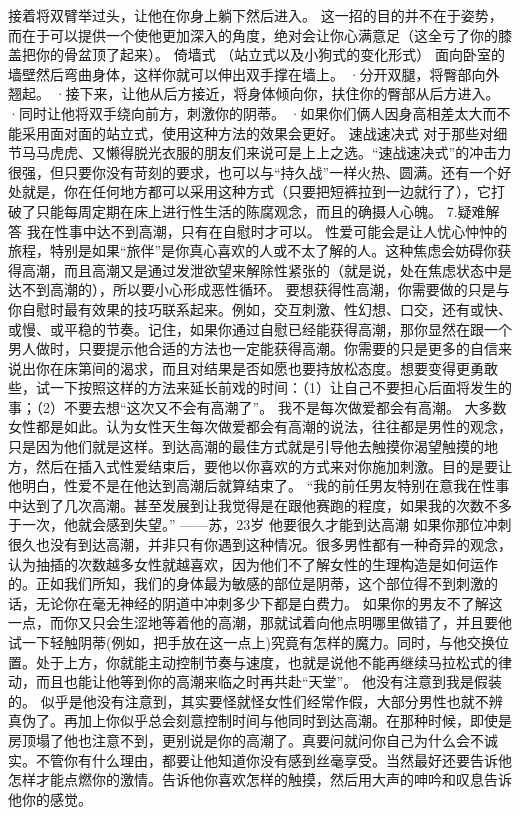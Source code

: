 \documentclass[12pt,UTF8,openany]{ctexbook}
\begin{document}
接着将双臂举过头，让他在你身上躺下然后进入。
这一招的目的并不在于姿势，而在于可以提供一个使他更加深入的角度，绝对会让你心满意足（这全亏了你的膝盖把你的骨盆顶了起来）。
倚墙式
（站立式以及小狗式的变化形式）
面向卧室的墙壁然后弯曲身体，这样你就可以伸出双手撑在墙上。
·分开双腿，将臀部向外翘起。
·接下来，让他从后方接近，将身体倾向你，扶住你的臀部从后方进入。
·同时让他将双手绕向前方，刺激你的阴蒂。
·如果你们俩人因身高相差太大而不能采用面对面的站立式，使用这种方法的效果会更好。
速战速决式
对于那些对细节马马虎虎、又懒得脱光衣服的朋友们来说可是上上之选。“速战速决式”的冲击力很强，但只要你没有苛刻的要求，也可以与“持久战”一样火热、圆满。还有一个好处就是，你在任何地方都可以采用这种方式（只要把短裤拉到一边就行了），它打破了只能每周定期在床上进行性生活的陈腐观念，而且的确摄人心魄。
7.疑难解答
我在性事中达不到高潮，只有在自慰时才可以。
性爱可能会是让人忧心忡忡的旅程，特别是如果“旅伴”是你真心喜欢的人或不太了解的人。这种焦虑会妨碍你获得高潮，而且高潮又是通过发泄欲望来解除性紧张的（就是说，处在焦虑状态中是达不到高潮的），所以要小心形成恶性循环。
要想获得性高潮，你需要做的只是与你自慰时最有效果的技巧联系起来。例如，交互刺激、性幻想、口交，还有或快、或慢、或平稳的节奏。记住，如果你通过自慰已经能获得高潮，那你显然在跟一个男人做时，只要提示他合适的方法也一定能获得高潮。你需要的只是更多的自信来说出你在床第间的渴求，而且对结果是否如愿也要持放松态度。想要变得更勇敢些，试一下按照这样的方法来延长前戏的时间：（1）让自己不要担心后面将发生的事；（2）不要去想“这次又不会有高潮了”。
我不是每次做爱都会有高潮。
大多数女性都是如此。认为女性天生每次做爱都会有高潮的说法，往往都是男性的观念，只是因为他们就是这样。到达高潮的最佳方式就是引导他去触摸你渴望触摸的地方，然后在插入式性爱结束后，要他以你喜欢的方式来对你施加刺激。目的是要让他明白，性爱不是在他达到高潮后就算结束了。
“我的前任男友特别在意我在性事中达到了几次高潮。甚至发展到让我觉得是在跟他赛跑的程度，如果我的次数不多于一次，他就会感到失望。”
——苏，23岁
他要很久才能到达高潮
如果你那位冲刺很久也没有到达高潮，并非只有你遇到这种情况。很多男性都有一种奇异的观念，认为抽插的次数越多女性就越喜欢，因为他们不了解女性的生理构造是如何运作的。正如我们所知，我们的身体最为敏感的部位是阴蒂，这个部位得不到刺激的话，无论你在毫无神经的阴道中冲刺多少下都是白费力。
如果你的男友不了解这一点，而你又只会生涩地等着他的高潮，那就试着向他点明哪里做错了，并且要他试一下轻触阴蒂(例如，把手放在这一点上)究竟有怎样的魔力。同时，与他交换位置。处于上方，你就能主动控制节奏与速度，也就是说他不能再继续马拉松式的律动，而且也能让他等到你的高潮来临之时再共赴“天堂”。
他没有注意到我是假装的。
似乎是他没有注意到，其实要怪就怪女性们经常作假，大部分男性也就不辨真伪了。再加上你似乎总会刻意控制时间与他同时到达高潮。在那种时候，即使是房顶塌了他也注意不到，更别说是你的高潮了。真要问就问你自己为什么会不诚实。不管你有什么理由，都要让他知道你没有感到丝毫享受。当然最好还要告诉他怎样才能点燃你的激情。告诉他你喜欢怎样的触摸，然后用大声的呻吟和叹息告诉他你的感觉。
\end{document}
